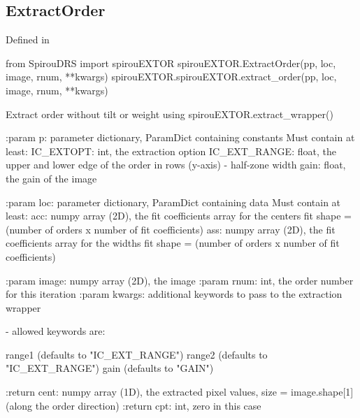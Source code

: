 \begin{minipage}{\textwidth}
\subsection{ExtractOrder}

Defined in \spirouEXTOR{}

\begin{pythonbox}
from SpirouDRS import spirouEXTOR
spirouEXTOR.ExtractOrder(pp, loc, image, rnum, **kwargs)
spirouEXTOR.spirouEXTOR.extract_order(pp, loc, image, rnum, **kwargs)
\end{pythonbox}

\begin{pythondocstring}
Extract order without tilt or weight using spirouEXTOR.extract_wrapper()

:param p: parameter dictionary, ParamDict containing constants
    Must contain at least:
            IC_EXTOPT: int, the extraction option
            IC_EXT_RANGE: float, the upper and lower edge of the order
                          in rows (y-axis) - half-zone width
            gain: float, the gain of the image

:param loc: parameter dictionary, ParamDict containing data
        Must contain at least:
            acc: numpy array (2D), the fit coefficients array for
                  the centers fit
                  shape = (number of orders x number of fit coefficients)
            ass: numpy array (2D), the fit coefficients array for
                  the widths fit
                  shape = (number of orders x number of fit coefficients)

:param image: numpy array (2D), the image
:param rnum: int, the order number for this iteration
:param kwargs: additional keywords to pass to the extraction wrapper

        - allowed keywords are:

        range1  (defaults to "IC_EXT_RANGE")
        range2  (defaults to "IC_EXT_RANGE")
        gain    (defaults to "GAIN")

:return cent: numpy array (1D), the extracted pixel values,
             size = image.shape[1] (along the order direction)
:return cpt: int, zero in this case
\end{pythondocstring}
\end{minipage}



